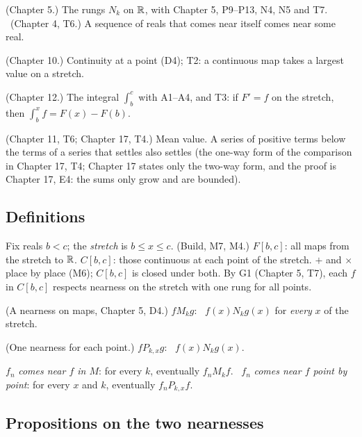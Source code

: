 \begin{lines}
\item[\lab{G1}] (Chapter 5.) The rungs $N_k$ on $\mathbb{R}$, with Chapter 5, P9--P13, N4, N5 and T7. \ (Chapter 4, T6.) A sequence of reals that comes near itself comes near some real.
\item[\lab{G2}] (Chapter 10.) Continuity at a point (D4); T2: a continuous map takes a largest value on a stretch.
\item[\lab{G3}] (Chapter 12.) The integral $\int_b^c$ with A1--A4, and T3: if $F' = f$ on the stretch, then $\int_b^x f = F(x) - F(b)$.
\item[\lab{G4}] (Chapter 11, T6; Chapter 17, T4.) Mean value. A series of positive terms below the terms of a series that settles also settles (the one-way form of the comparison in Chapter 17, T4; Chapter 17 states only the two-way form, and the proof is Chapter 17, E4: the sums only grow and are bounded).
\end{lines}

\subsection*{Definitions}

\begin{lines}
\item[\lab{D1}] Fix reals $b < c$; the \emph{stretch} is $b \le x \le c$. (Build, M7, M4.) $F[b,c]$: all maps from the stretch to $\mathbb{R}$. $C[b,c]$: those continuous at each point of the stretch. $+$ and $\times$ place by place (M6); $C[b,c]$ is closed under both. By G1 (Chapter 5, T7), each $f$ in $C[b,c]$ respects nearness on the stretch with one rung for all points.
\item[\lab{D2}] (A nearness on maps, Chapter 5, D4.) $f \mathrel{M_k} g$: \ $f(x) \mathrel{N_k} g(x)$ for \emph{every} $x$ of the stretch.
\item[\lab{D3}] (One nearness for each point.) $f \mathrel{P_{k,x}} g$: \ $f(x) \mathrel{N_k} g(x)$.
\item[\lab{D4}] $f_n$ \emph{comes near $f$ in $M$}: for every $k$, eventually $f_n \mathrel{M_k} f$. \ $f_n$ \emph{comes near $f$ point by point}: for every $x$ and $k$, eventually $f_n \mathrel{P_{k,x}} f$.
\end{lines}

\subsection*{Propositions on the two nearnesses}

